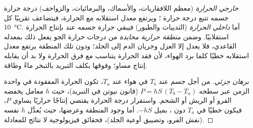 \begin{proposition}\label{prop:b1:organism-environment:thermo}
\emph{خارجي الحرارة} (معظم اللافقاريات،
والأسماك، والبرمائيات، والزواحف) درجة حرارة جسمه تتبع درجة حرارة
؛ ويرتفع معدل استقلابه مع الحرارة، فيتضاعف تقريبًا كل
\qty{10}{\celsius}. أما \emph{داخلي الحرارة}
(الثدييات والطيور) فيبقي حرارة جسمه عند  بإنتاج الحرارة
استقلابيًا. وضمن \emph{منطقة حرارية محايدة}
من درجات حرارة الجو يفعل ذلك بمعدله القاعدي، فلا يعدل إلا العزل
وجريان الدم إلى الجلد؛ ودون تلك المنطقة يرتفع معدل استقلابه خطيًا
كلما برد الهواء، لأن فقد الحرارة يتناسب مع فرق الحرارة ولا بد أن
يقابله إنتاج مساو؛ وفوقها يكلف التبريد بالتبخر ماءً وطاقة.
\end{proposition}
\begin{proof}[برهان جزئي]
من أجل جسم عند $T_b$ في هواء عند $T_a$، تكون الحرارة المفقودة في
واحدة الزمن عبر سطحه $P = hS\,(T_b - T_a)$ (قانون نيوتن في التبريد)،
حيث $h$ معامل يخفضه الفرو أو الريش أو الشحم. واستقرار درجة الحرارة
يقتضي إنتاجًا حراريًا يساوي $P$، فيكون خطيًا في $T_a$ دون ، بميل $-hS$. أما وجود المنطقة وعرضها، حيث يُعدَّل
$h$ نفسه (نفش الفرو، وتضييق أوعية الجلد)، فحقائق فيزيولوجية لا نتائج
للمعادلة.
\end{proof}

